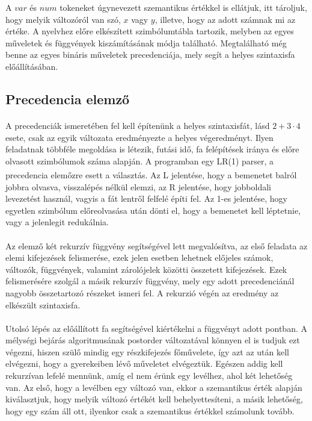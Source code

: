 \documentclass[12pt]{report}
\begin{document}
A $var$ és $num$ tokeneket úgynevezett szemantikus értékkel is ellátjuk, itt tároljuk, hogy melyik változóról van szó, $x$ vagy $y$, illetve, hogy az adott számnak mi az értéke. A nyelvhez előre elkészített szimbólumtábla tartozik, melyben az egyes műveletek és függvények kiszámításának módja található. Megtalálható még benne az egyes bináris műveletek precedenciája, mely segít a helyes szintaxisfa előállításában.

\subsection{Precedencia elemző}
\paragraph{}
A precedenciák ismeretében fel kell építenünk a helyes szintaxisfát, lásd $2+3\cdot4$ esete, csak az egyik változata eredményezte a helyes végeredményt. Ilyen feladatnak többféle megoldása is létezik, futási idő, fa felépítések iránya és előre olvasott szimbólumok száma alapján. A programban egy LR(1) parser, a precedencia elemőzre\textsuperscript{\cite{parser}} esett a választás. Az L jelentése, hogy a bemenetet balról jobbra olvasva, visszalépés nélkül elemzi, az R jelentése, hogy jobboldali levezetést használ, vagyis a fát lentről felfelé építi fel. Az 1-es jelentése, hogy egyetlen szimbólum előreolvasása után dönti el, hogy a bemenetet kell léptetnie, vagy a jelenlegit redukálnia.
\paragraph{}
Az elemző két rekurzív függvény segítségével lett megvalósítva, az első feladata az elemi kifejezések felismerése, ezek jelen esetben lehetnek előjeles számok, változók, függvények, valamint zárolójelek közötti összetett kifejezések. Ezek felismerésére szolgál a másik rekurzív függvény, mely egy adott precedenciánál nagyobb összetartozó részeket ismeri fel. A rekurzió végén az eredmény az elkészült szintaxisfa.
\paragraph{}
Utolsó lépés az előállított fa segítségével kiértékelni a függvényt adott pontban. A mélységi bejárás algoritmusának postorder változatával könnyen el is tudjuk ezt végezni, hiszen szülő mindig egy részkifejezés főművelete, így azt az után kell elvégezni, hogy a gyerekeiben lévő műveletet elvégeztük. Egészen addig kell rekurzívan lefelé mennünk, amíg el nem érünk egy levélhez, ahol két lehetőség van. Az első, hogy a levélben egy változó van, ekkor a szemantikus érték alapján kiválasztjuk, hogy melyik változó értékét kell behelyettesíteni, a másik lehetőség, hogy egy szám áll ott, ilyenkor csak a szemantikus értékkel számolunk tovább.
\end{document}
